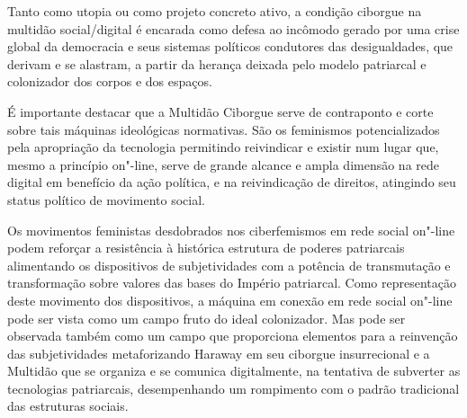 Tanto como utopia ou como projeto concreto ativo, a condição ciborgue na
multidão social/digital é encarada como defesa ao incômodo gerado por
uma crise global da democracia e seus sistemas políticos condutores das
desigualdades, que derivam e se alastram, a partir da herança deixada
pelo modelo patriarcal e colonizador dos corpos e dos espaços.

É importante destacar que a Multidão Ciborgue serve de contraponto e
corte sobre tais máquinas ideológicas normativas. São os feminismos
potencializados pela apropriação da tecnologia permitindo reivindicar e
existir num lugar que, mesmo a princípio on"-line, serve de grande
alcance e ampla dimensão na rede digital em benefício da ação política,
e na reivindicação de direitos, atingindo seu status político de
movimento social.

Os movimentos feministas desdobrados nos ciberfemismos em rede social
on"-line podem reforçar a resistência à histórica estrutura de poderes
patriarcais alimentando os dispositivos de subjetividades com a potência
de transmutação e transformação sobre valores das bases do Império
patriarcal. Como representação deste movimento dos dispositivos, a
máquina em conexão em rede social on"-line pode ser vista como um campo
fruto do ideal colonizador. Mas pode ser observada também como um campo
que proporciona elementos para a reinvenção das subjetividades
metaforizando Haraway em seu ciborgue insurrecional e a Multidão que se
organiza e se comunica digitalmente, na tentativa de subverter as
tecnologias patriarcais, desempenhando um rompimento com o padrão
tradicional das estruturas sociais.

